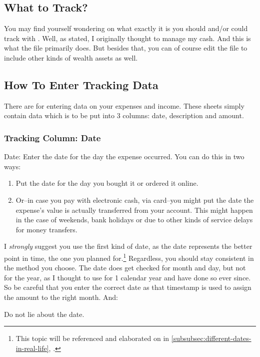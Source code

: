 \subsection{What to Track?}
\label{subsec:what-to-track}

You may find yourself wondering on what exactly it is you should and/or could track with \tfn.
Well, as stated, I originally thought to manage my cash.
And this is what the file primarily does.
But besides that, you can of course edit the file to include other kinds of wealth assets as well.

\subsection{How To Enter Tracking Data}
\label{subsec:enter-tracking-data}

There are  for entering data on your expenses and income.
These sheets simply contain data which is to be put into 3 columns: date, description and amount.

\subsubsection{Tracking Column: Date}
\label{subsec:tracking-column-date}

Date: Enter the date for the day the expense occurred.
You can do this in two ways:
\begin{enumerate}
	\item Put the date for the day you bought it or ordered it online.
	\item Or--in case you pay with electronic cash, \eg via card--you might put the date the expense's value is actually transferred from your account.
	This might happen in the case of weekends, bank holidays or due to other kinds of service delays for money transfers.
\end{enumerate}
I \emph{strongly} suggest you use the first kind of date, as the date represents the better point in time, \ie the one you planned for.\footnote{This topic will be referenced and elaborated on in \autoref{subsubsec:different-dates-in-real-life}, .}
Regardless, you should stay consistent in the method you choose.
The date does get checked for month and day, but not for the year, as I thought to use \tfn for 1 calendar year and have done so ever since.
So be careful that you enter the correct date as that timestamp is used to assign the amount to the right month.
And:
\begin{specialnote}
	Do not lie about the date.
\end{specialnote}

